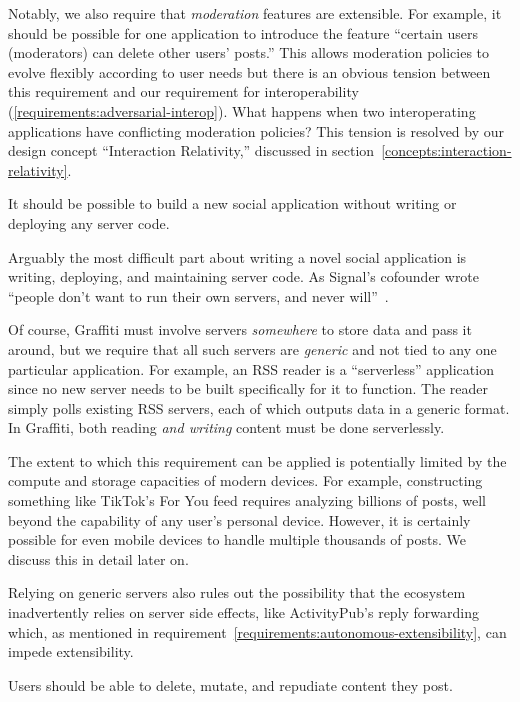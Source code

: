 Notably, we also require that \emph{moderation} features are extensible.
For example, it should be possible for one application to introduce the feature
``certain users (moderators) can delete other users' posts.''
This allows moderation policies to evolve flexibly according to user needs
but there is an obvious tension between this requirement
and our requirement for interoperability (\ref{requirements:adversarial-interop}).
What happens when two interoperating applications have conflicting moderation policies?
This tension is resolved by our design concept ``Interaction Relativity,''
discussed in section~\ref{concepts:interaction-relativity}.

\begin{requirement}[Serverless]
    It should be possible to build a new social application without writing or deploying any server code.
\end{requirement}

Arguably the most difficult part about writing a novel
social application is writing, deploying,
and maintaining server code.
As Signal's cofounder wrote
``people don’t want to run their own servers, and never will''~\cite{moxieweb3}.

Of course, Graffiti must involve servers \emph{somewhere} to store data
and pass it around, but we require that all such servers are \emph{generic}
and not tied to any one particular application.
For example, an RSS reader is a ``serverless'' application since
no new server needs to be built specifically for it to function.
The reader simply polls existing RSS servers, each of which outputs data in a generic format.
In Graffiti, both reading \emph{and writing} content must be done serverlessly.

The extent to which this requirement can be applied is potentially limited
by the compute and storage capacities of modern devices.
For example, constructing something like TikTok's For You feed requires
analyzing billions of posts, well beyond the capability of any user's personal device.
However, it is certainly possible for even mobile devices to handle multiple thousands of posts.
We discuss this in detail later on.

Relying on generic servers also rules out the possibility that
the ecosystem inadvertently relies on server side effects,
like ActivityPub's reply forwarding which, as mentioned in
requirement~\ref{requirements:autonomous-extensibility}, can impede extensibility.


\begin{requirement}[Forgiving]
\label{requirements:forgiving}
    Users should be able to delete, mutate, and repudiate content they post.
\end{requirement}

